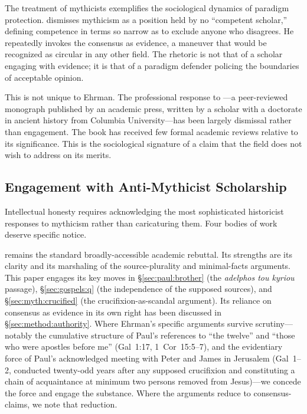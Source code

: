 \documentclass[12pt,oneside]{article}
\newcommand{\grk}[1]{\textit{#1}}   %
\begin{document}
The treatment of mythicists exemplifies the sociological dynamics of
paradigm protection.  \citet{Ehrman2012} dismisses mythicism as a
position held by no ``competent scholar,'' defining competence in terms
so narrow as to exclude anyone who disagrees.  He repeatedly invokes the
consensus as evidence, a maneuver that would be recognized as circular
in any other field.  The rhetoric is not that of a scholar engaging with
evidence; it is that of a paradigm defender policing the boundaries of
acceptable opinion.

This is not unique to Ehrman.  The professional response to
\citet{Carrier2014}---a peer-reviewed monograph published by an academic
press, written by a scholar with a doctorate in ancient history from
Columbia University---has been largely dismissal rather than engagement.
The book has received few formal academic reviews relative to its
significance.  This is the sociological signature of a claim that the
field does not wish to address on its merits.

\subsection{Engagement with Anti-Mythicist Scholarship}
\label{sec:sociology:engagement}

Intellectual honesty requires acknowledging the most sophisticated
historicist responses to mythicism rather than caricaturing them.
Four bodies of work deserve specific notice.

\citet{Ehrman2012} remains the standard broadly-accessible academic
rebuttal.  Its strengths are its clarity and its marshaling of the
source-plurality and minimal-facts arguments.  This paper engages its
key moves in §\ref{sec:paul:brother} (the \grk{adelphos tou kyriou}
passage), §\ref{sec:gospels:q} (the independence of the supposed
sources), and §\ref{sec:myth:crucified} (the crucifixion-as-scandal
argument).  Its reliance on consensus as evidence in its own right
has been discussed in §\ref{sec:method:authority}.  Where Ehrman's
specific arguments survive scrutiny---notably the cumulative structure
of Paul's references to ``the twelve'' and ``those who were apostles
before me'' (Gal~1:17, 1~Cor~15:5--7), and the evidentiary force of
Paul's acknowledged meeting with Peter and James in Jerusalem (Gal~1--2,
conducted twenty-odd years after any supposed crucifixion and
constituting a chain of acquaintance at minimum two persons removed
from Jesus)---we concede the force and engage the substance.  Where
the arguments reduce to consensus-claims, we note that reduction.
\end{document}
